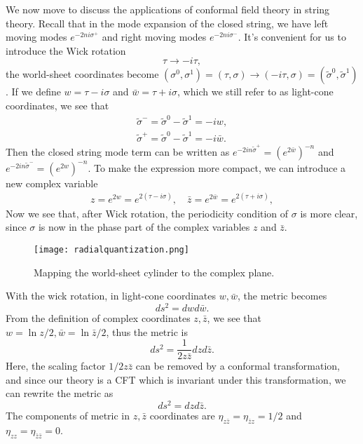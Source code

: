 \documentclass[graybox,envcountchap,sectrefs]{svmono}
\begin{document}
We now move to discuss the applications of conformal field theory in string theory. Recall that in the mode expansion of the closed string, we have left moving modes $e^{-2ni\sigma^{+}}$ and right moving modes $e^{-2ni\sigma^{-}}$. 
It's convenient for us to introduce the Wick rotation 
$$\tau \to -i\tau,$$
the world-sheet coordinates become $(\sigma^0,\sigma^1)=(\tau,\sigma)\to (-i\tau,\sigma)=(\tilde{\sigma}^0,\tilde{\sigma}^1)$.
If we define $w=\tau-i\sigma$ and $\bar{w}=\tau+i\sigma$, which we still refer to as light-cone coordinates, we see that 
\begin{align}
	\tilde{\sigma}^-=\tilde{\sigma}^0-\tilde{\sigma}^1=-iw,\\
	\tilde{\sigma}^+=\tilde{\sigma}^0-\tilde{\sigma}^1=-i\bar{w}.
\end{align}
Then the closed string mode term can be written as $e^{-2in\tilde{\sigma}^+}=(e^{2\bar{w}})^{-n}$ and $e^{-2in\tilde{\sigma}^-}=(e^{2{w}})^{-n}$.
To make the expression more compact, we can introduce a new complex variable
\begin{align}
z=e^{2w}=e^{2(\tau-i\sigma)},\quad 	\bar{z}=e^{2\bar{w}}=e^{2(\tau
+i\sigma)},
\end{align}
Now we see that, after Wick rotation, the periodicity condition of $\sigma$ is more clear, since $\sigma$ is now in the phase part of the complex variables $z$ and $\bar{z}$.

\begin{figure}
  \centering
  \texttt{[image: radialquantization.png]}\\
\caption{Mapping the world-sheet cylinder to the complex plane.}
\label{fig:radialquan}
\end{figure}


With the wick rotation, in light-cone coordinates $w,\bar{w}$, the metric becomes
$$ds^2=dwd\bar{w}.$$
From the definition of complex coordinates $z,\bar{z}$, we see that $w=\ln z/2,\bar{w}=\ln \bar{z}/2$, thus the metric is
$$ds^2=\frac{1}{2z\bar{z}}dzd\bar{z}.$$
Here, the scaling factor ${1}/{2z\bar{z}}$ can be removed by a conformal transformation, and since our theory is a CFT which is invariant under this transformation, we can rewrite the metric as 
$$ds^2=dzd\bar{z}.$$
The components of metric in $z,\bar{z}$ coordinates are $\eta_{z\bar{z}}=\eta_{\bar{z}z}=1/2$ and $\eta_{zz}=\eta_{\bar{z}\bar{z}}=0$.
\end{document}
